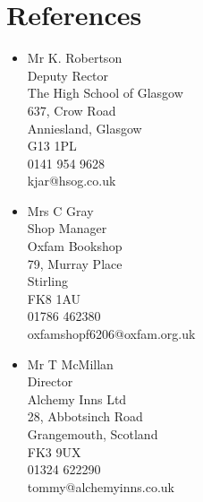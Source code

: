 \documentclass[10pt, a4paper]{article}
\begin{document}
\section{References}
	\begin{multicols}{3}
		\begin{itemize}
			\item Mr K. Robertson \\ Deputy Rector \\ The High School of Glasgow \\ 637, Crow Road	\\ Anniesland, Glasgow	\\ G13 1PL \\ 0141 954 9628	\\ kjar@hsog.co.uk
			\item Mrs C Gray \\ Shop Manager \\ Oxfam Bookshop \\ 79, Murray Place \\ Stirling \\ FK8 1AU \\ 01786 462380 \\ oxfamshopf6206@oxfam.org.uk
			\item Mr T McMillan \\ Director \\ Alchemy Inns Ltd \\ 28, Abbotsinch Road \\ Grangemouth, Scotland \\ FK3 9UX \\ 01324 622290 \\tommy@alchemyinns.co.uk
		\end{itemize}
	\end{multicols}
\end{document}
